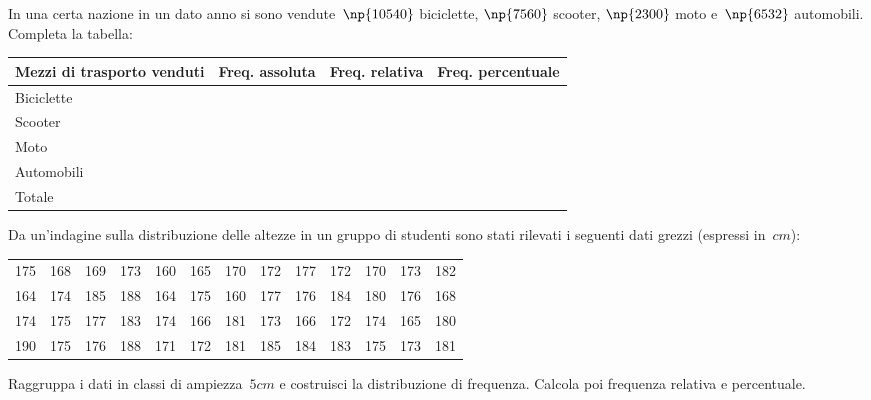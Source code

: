 \begin{esercizio}
\label{ese:A.3}
In una certa nazione in un dato anno si sono vendute~$\np{10540}$ biciclette, $\np{7560}$ scooter, $\np{2300}$ moto e~$\np{6532}$ automobili. Completa la tabella:
\begin{center}
 \begin{tabularx}{.9\textwidth}{Xccc}
\toprule
Mezzi di trasporto venduti & Freq. assoluta & Freq. relativa & Freq. percentuale \\
\midrule
Biciclette & & & \\
Scooter & & & \\
Moto & & & \\
Automobili & & & \\
\midrule
Totale & & & \\
\bottomrule
\end{tabularx}
\end{center}
\end{esercizio}

\begin{esercizio}
\label{ese:A.4}
Da un'indagine sulla distribuzione delle altezze in un gruppo di studenti sono stati rilevati i seguenti dati grezzi (espressi in~$\unit{cm}$):
\begin{center}
 \begin{tabular}{ccccccccccccc}
175 & 168 & 169 & 173 & 160 & 165 & 170 & 172 & 177 & 172 & 170 & 173 & 182 \\
164 & 174 & 185 & 188 & 164 & 175 & 160 & 177 & 176 & 184 & 180 & 176 & 168 \\
174 & 175 & 177 & 183 & 174 & 166 & 181 & 173 & 166 & 172 & 174 & 165 & 180 \\
190 & 175 & 176 & 188 & 171 & 172 & 181 & 185 & 184 & 183 & 175 & 173 & 181 \\
 \end{tabular}
\end{center}
Raggruppa i dati in classi di ampiezza~$5 \unit{cm}$ e costruisci la distribuzione di frequenza. Calcola poi frequenza relativa e percentuale.
\end{esercizio}

